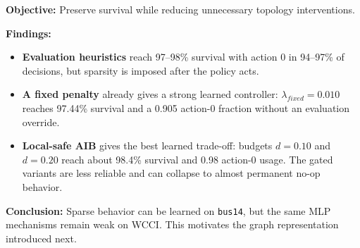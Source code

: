 \begin{tcolorbox}[
  colframe=red!75!black,
  colback=red!5!white,
  title=Chapter Summary
]
\textbf{Objective:} Preserve survival while reducing unnecessary topology
interventions.

\textbf{Findings:}
\begin{itemize}
  \item \textbf{Evaluation heuristics} reach 97--98\% survival with action 0 in
  94--97\% of decisions, but sparsity is imposed after the policy acts.
  \item \textbf{A fixed penalty} already gives a strong learned controller:
  $\lambda_{fixed}=0.010$ reaches 97.44\% survival and a 0.905 action-0
  fraction without an evaluation override.
  \item \textbf{Local-safe AIB} gives the best learned trade-off: budgets
  $d=0.10$ and $d=0.20$ reach about 98.4\% survival and 0.98 action-0 usage.
  The gated variants are less reliable and can collapse to almost permanent
  no-op behavior.
\end{itemize}

\textbf{Conclusion:} Sparse behavior can be learned on \texttt{bus14}, but the
same MLP mechanisms remain weak on WCCI. This motivates the graph
representation introduced next.
\end{tcolorbox}
